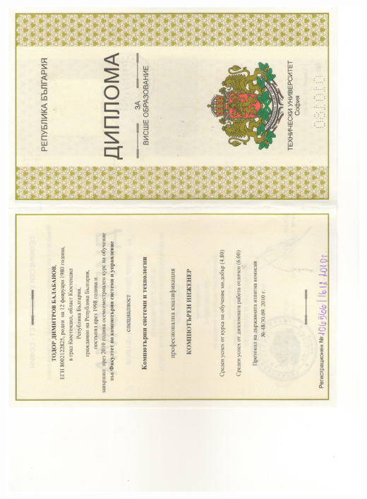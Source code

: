 \documentclass[bulgarian,a4paper]{europasscv}
\begin{document}
\includegraphics[width=\textwidth,height=\textheight,keepaspectratio]{DiplomaTU2010_1}
\end{document}
